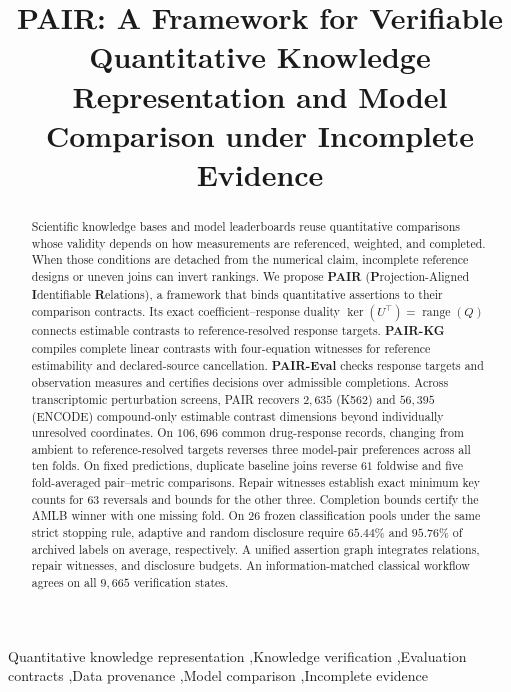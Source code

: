 \documentclass[preprint,12pt,number,sort&compress]{elsarticle}
\providecommand{\PaperTitle}{PAIR: A Framework for Verifiable Quantitative Knowledge Representation and Model Comparison under Incomplete Evidence}
\begin{document}
\begin{frontmatter}
\title{\PaperTitle}

\begin{abstract}
Scientific knowledge bases and model leaderboards reuse quantitative comparisons whose validity depends on how measurements are referenced, weighted, and completed. When those conditions are detached from the numerical claim, incomplete reference designs or uneven joins can invert rankings. We propose \textbf{PAIR} (\textbf{P}rojection-Aligned \textbf{I}dentifiable \textbf{R}elations), a framework that binds quantitative assertions to their comparison contracts. Its exact coefficient--response duality $\ker(U^\top)=\operatorname{range}(Q)$ connects estimable contrasts to reference-resolved response targets. \textbf{PAIR-KG} compiles complete linear contrasts with four-equation witnesses for reference estimability and declared-source cancellation. \textbf{PAIR-Eval} checks response targets and observation measures and certifies decisions over admissible completions. Across transcriptomic perturbation screens, PAIR recovers $2{,}635$ (K562) and $56{,}395$ (ENCODE) compound-only estimable contrast dimensions beyond individually unresolved coordinates. On $106{,}696$ common drug-response records, changing from ambient to reference-resolved targets reverses three model-pair preferences across all ten folds. On fixed predictions, duplicate baseline joins reverse $61$ foldwise and five fold-averaged pair--metric comparisons. Repair witnesses establish exact minimum key counts for $63$ reversals and bounds for the other three. Completion bounds certify the AMLB winner with one missing fold. On $26$ frozen classification pools under the same strict stopping rule, adaptive and random disclosure require $65.44\%$ and $95.76\%$ of archived labels on average, respectively. A unified assertion graph integrates relations, repair witnesses, and disclosure budgets. An information-matched classical workflow agrees on all $9{,}665$ verification states.
\end{abstract}
\begin{keyword}
Quantitative knowledge representation \sep Knowledge verification \sep Evaluation contracts \sep Data provenance \sep Model comparison \sep Incomplete evidence
\end{keyword}
\end{frontmatter}
\end{document}
